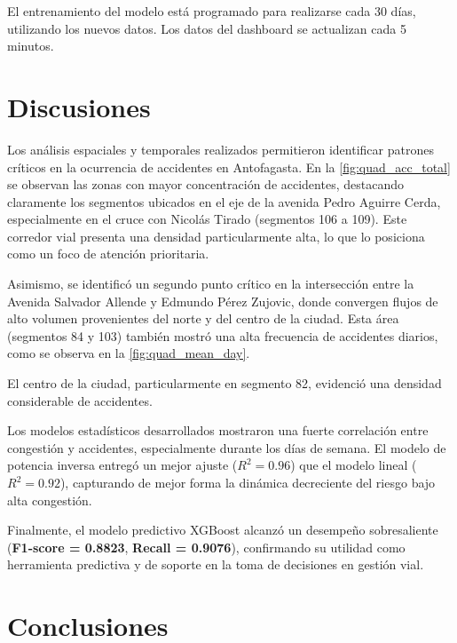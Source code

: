 \documentclass[12pt]{article}
\begin{document}
El entrenamiento del modelo está programado para realizarse cada 30 días, utilizando los nuevos datos. Los datos del dashboard se actualizan cada 5 minutos.


\section{Discusiones}

Los análisis espaciales y temporales realizados permitieron identificar patrones críticos en la ocurrencia de accidentes en Antofagasta. En la \cref{fig:quad_acc_total} se observan las zonas con mayor concentración de accidentes, destacando claramente los segmentos ubicados en el eje de la avenida Pedro Aguirre Cerda, especialmente en el cruce con Nicolás Tirado (segmentos 106 a 109). Este corredor vial presenta una densidad particularmente alta, lo que lo posiciona como un foco de atención prioritaria.

Asimismo, se identificó un segundo punto crítico en la intersección entre la Avenida Salvador Allende y Edmundo Pérez Zujovic, donde convergen flujos de alto volumen provenientes del norte y del centro de la ciudad. Esta área (segmentos 84 y 103) también mostró una alta frecuencia de accidentes diarios, como se observa en la \cref{fig:quad_mean_day}.

El centro de la ciudad, particularmente en segmento 82, evidenció una densidad considerable de accidentes.

Los modelos estadísticos desarrollados mostraron una fuerte correlación entre congestión y accidentes, especialmente durante los días de semana. El modelo de potencia inversa entregó un mejor ajuste ($R^2 = 0.96$) que el modelo lineal ($R^2 = 0.92$), capturando de mejor forma la dinámica decreciente del riesgo bajo alta congestión.

Finalmente, el modelo predictivo XGBoost alcanzó un desempeño sobresaliente (\textbf{F1-score = 0.8823}, \textbf{Recall = 0.9076}), confirmando su utilidad como herramienta predictiva y de soporte en la toma de decisiones en gestión vial.




\section{Conclusiones}
\end{document}
